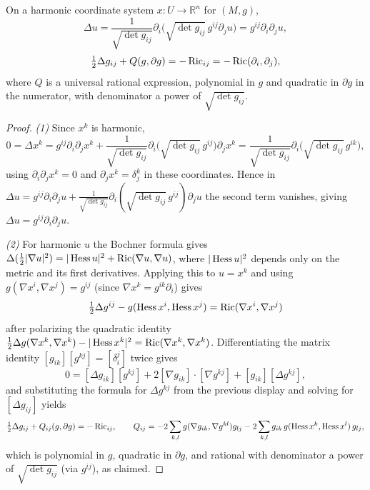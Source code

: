 \begin{lemma}
  \label{lem:pet-ch11-laplacian-ricci-harmonic-coords}
  On a harmonic coordinate system $x:U\to\mathbb{R}^n$ for $(M,g)$,
  \begin{equation}
    \Delta u=\frac1{\sqrt{\det g_{ij}}}\partial_i\big(\sqrt{\det g_{ij}}\,g^{ij}\partial_ju\big)=g^{ij}\partial_i\partial_ju,
  \end{equation}
  \begin{equation}
    \tfrac12\Delta g_{ij}+Q(g,\partial g)=-\operatorname{Ric}_{ij}=-\operatorname{Ric}(\partial_i,\partial_j),
  \end{equation}
  where $Q$ is a universal rational expression, polynomial in $g$ and
  quadratic in $\partial g$ in the numerator, with denominator a power of
  $\sqrt{\det g_{ij}}$.
\end{lemma}
\begin{proof}
  \emph{(1)} Since $x^k$ is harmonic,
  \[
    0=\Delta x^k=g^{ij}\partial_i\partial_jx^k
    +\frac1{\sqrt{\det g_{ij}}}\partial_i\big(\sqrt{\det g_{ij}}\,g^{ij}\big)\partial_jx^k
    =\frac1{\sqrt{\det g_{ij}}}\partial_i\big(\sqrt{\det g_{ij}}\,g^{ik}\big),
  \]
  using $\partial_i\partial_jx^k=0$ and $\partial_jx^k=\delta_j^k$ in these
  coordinates. Hence in
  $\Delta u=g^{ij}\partial_i\partial_ju+\frac1{\sqrt{\det g_{ij}}}\partial_i(\sqrt{\det g_{ij}}\,g^{ij})\partial_ju$
  the second term vanishes, giving $\Delta u=g^{ij}\partial_i\partial_ju$.

  \emph{(2)} For harmonic $u$ the Bochner formula gives
  $\Delta(\tfrac12|\nabla u|^2)=|\operatorname{Hess} u|^2+\operatorname{Ric}(\nabla u,\nabla u)$, where
  $|\operatorname{Hess} u|^2$ depends only on the metric and its first derivatives.
  Applying this to $u=x^k$ and using $g(\nabla x^i,\nabla x^j)=g^{ij}$
  (since $\nabla x^k=g^{ik}\partial_i$) gives
  \[
    \tfrac12\Delta g^{ij}-g(\operatorname{Hess} x^i,\operatorname{Hess} x^j)=\operatorname{Ric}(\nabla x^i,\nabla x^j)
  \]
  after polarizing the quadratic identity
  $\tfrac12\Delta g(\nabla x^k,\nabla x^k)-|\operatorname{Hess} x^k|^2=\operatorname{Ric}(\nabla x^k,\nabla x^k)$.
  Differentiating the matrix identity $[g_{ik}][g^{kj}]=[\delta_i^j]$ twice
  gives
  \[
    0=[\Delta g_{ik}][g^{kj}]+2[\nabla g_{ik}]\cdot[\nabla g^{kj}]+[g_{ik}][\Delta g^{kj}],
  \]
  and substituting the formula for $\Delta g^{kj}$ from the previous display
  and solving for $[\Delta g_{ij}]$ yields
  \[
    \tfrac12\Delta g_{ij}+Q_{ij}(g,\partial g)=-\operatorname{Ric}_{ij},\qquad
    Q_{ij}=-2\sum_{k,l}g(\nabla g_{ik},\nabla g^{kl})g_{lj}-2\sum_{k,l}g_{ik}\,g(\operatorname{Hess} x^k,\operatorname{Hess} x^l)\,g_{lj},
  \]
  which is polynomial in $g$, quadratic in $\partial g$, and rational with
  denominator a power of $\sqrt{\det g_{ij}}$ (via $g^{ij}$), as claimed.
\end{proof}

